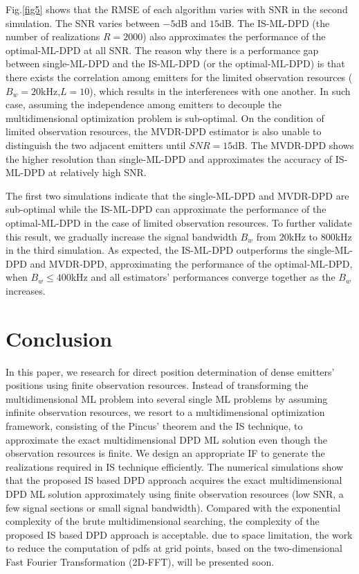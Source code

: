 \documentclass[review]{elsarticle}
\begin{document}
Fig.\ref{fig5} shows that the RMSE of each algorithm varies with SNR in the second simulation. The SNR varies between $-5$dB and $15$dB. The IS-ML-DPD (the number of realizations $R=2000$) also approximates the performance of the optimal-ML-DPD at all SNR. The reason why there is a performance gap between single-ML-DPD and the IS-ML-DPD (or the optimal-ML-DPD) is that there exists the correlation among emitters for the limited observation resources ($B_w=20$kHz,$L=10$), which results in the interferences with one another. In such case, assuming the independence among emitters to decouple the multidimensional optimization problem is sub-optimal. On the condition of limited observation resources, the MVDR-DPD estimator is also unable to distinguish the two adjacent emitters until $SNR= 15$dB. The MVDR-DPD shows the higher resolution than single-ML-DPD and approximates the accuracy of IS-ML-DPD at relatively high SNR.

The first two simulations indicate that the single-ML-DPD and MVDR-DPD are sub-optimal while the IS-ML-DPD can approximate the performance of the optimal-ML-DPD in the case of limited observation resources. To further validate this result, we gradually increase the signal bandwidth $B_w$ from $20$kHz to $800$kHz in the third simulation. As expected, the IS-ML-DPD outperforms the single-ML-DPD and MVDR-DPD, approximating the performance of the optimal-ML-DPD, when $B_w\leq400$kHz and all estimators' performances converge together as the $B_w$ increases.

\section{Conclusion}
In this paper, we research for direct position determination of dense emitters' positions using finite observation resources. Instead of transforming the multidimensional ML problem into several single ML problems by assuming infinite observation resources, we resort to a multidimensional optimization framework, consisting of the Pincus' theorem \cite{Pincus1968A} and the IS technique, to approximate the exact multidimensional DPD ML solution even though the observation resources is finite. We design an appropriate IF to generate the realizations required in IS technique efficiently. The numerical simulations show that the proposed IS based DPD approach acquires the exact multidimensional DPD ML solution approximately using finite observation resources (low SNR, a few signal sections or small signal bandwidth). Compared with the exponential complexity of the brute multidimensional searching, the complexity of the proposed IS based DPD approach is acceptable. due to space limitation, the work to reduce the computation of pdfs at grid points, based on the two-dimensional Fast Fourier Transformation (2D-FFT), will be presented soon. 
\end{document}
